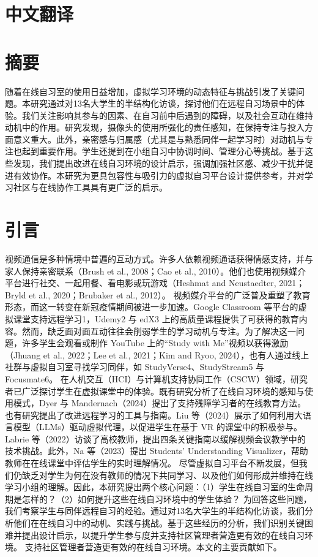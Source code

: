 \documentclass[12pt]{ctexart}
\begin{document}
\pagestyle{empty}
\section*{中文翻译}

\section{摘要}
随着在线自习室的使用日益增加，虚拟学习环境的动态特征与挑战引发了关键问题。本研究通过对13名大学生的半结构化访谈，探讨他们在远程自习场景中的体验。我们关注影响其参与的因素、在自习前中后遇到的障碍，以及社会互动在维持动机中的作用。研究发现，摄像头的使用所强化的责任感知，在保持专注与投入方面意义重大。此外，亲密感与归属感（尤其是与熟悉同伴一起学习时）对动机与专注也起到重要作用。学生还提到在小组自习中协调时间、管理分心等挑战。基于这些发现，我们提出改进在线自习环境的设计启示，强调加强社区感、减少干扰并促进有效协作。本研究为更具包容性与吸引力的虚拟自习平台设计提供参考，并对学习社区与在线协作工具具有更广泛的启示。

\section{引言}
视频通信是多种情境中普遍的互动方式。许多人依赖视频通话获得情感支持，并与家人保持亲密联系（Brush et al., 2008；Cao et al., 2010）。他们也使用视频媒介平台进行社交、一起用餐、看电影或玩游戏（Heshmat and Neustaedter, 2021；Bryld et al., 2020；Brubaker et al., 2012）。
视频媒介平台的广泛普及重塑了教育形态，而这一转变在新冠疫情期间被进一步加速。Google Classroom 等平台的虚拟课堂支持远程学习1，Udemy2 与 edX3 上的高质量课程提供了可获得的教育内容。然而，缺乏面对面互动往往会削弱学生的学习动机与专注。为了解决这一问题，许多学生会观看或制作 YouTube 上的“Study with Me”视频以获得激励（Jhuang et al., 2022；Lee et al., 2021；Kim and Ryoo, 2024），也有人通过线上社群与虚拟自习室寻找学习同伴，如 StudyVerse4、StudyStream5 与 Focusmate6。
在人机交互（HCI）与计算机支持协同工作（CSCW）领域，研究者已广泛探讨学生在虚拟课堂中的体验。既有研究分析了在线自习环境的感知与使用模式，Dyer 与 Mandernach（2024）提出了支持残障学习者的在线教育方法。也有研究提出了改进远程学习的工具与指南。Liu 等（2024）展示了如何利用大语言模型（LLMs）驱动虚拟代理，以促进学生在基于 VR 的课堂中的积极参与。Labrie 等（2022）访谈了高校教师，提出四条关键指南以缓解视频会议教学中的技术挑战。此外，Na 等（2023）提出 Students’ Understanding Visualizer，帮助教师在在线课堂中评估学生的实时理解情况。
尽管虚拟自习平台不断发展，但我们仍缺乏对学生为何在没有教师的情况下共同学习、以及他们如何形成并维持在线学习小组的理解。因此，本研究提出两个核心问题：（1）学生在线自习室的生命周期是怎样的？（2）如何提升这些在线自习环境中的学生体验？
为回答这些问题，我们考察学生与同伴远程自习的经验。通过对13名大学生的半结构化访谈，我们分析他们在在线自习中的动机、实践与挑战。基于这些经历的分析，我们识别关键困难并提出设计启示，以提升学生参与度并支持社区管理者营造更有效的在线自习环境。
支持社区管理者营造更有效的在线自习环境。本文的主要贡献如下。
\end{document}
